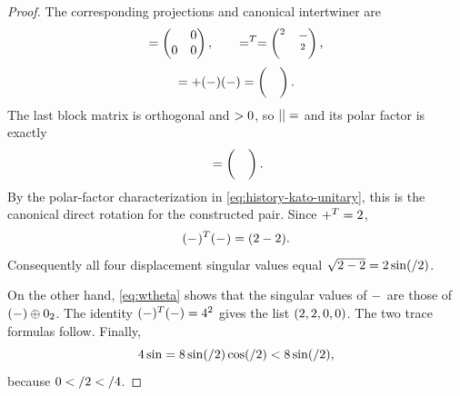 \begin{proof}
The corresponding projections and canonical intertwiner are
\[
 \sym{Psource}=\begin{pmatrix}\sym{IdentityTwo}&0\\0&0\end{pmatrix},\qquad
 \sym{Qtarget}=\sym{Yframe}\sym{Yframe}^T=\begin{pmatrix}\like{CosAngle}{\symglyph{CosAngle}^2}\sym{IdentityTwo}&-\sym{SinAngle}\sym{CosAngle}\sym{Jturn}\\\sym{SinAngle}\sym{CosAngle}\sym{Jturn}&\like{SinAngle}{\symglyph{SinAngle}^2}\sym{IdentityTwo}\end{pmatrix},
\]
\begin{equation}
 \sym{IntertwinerT}=\sym{Qtarget}\sym{Psource}+(\sym{Identity}-\sym{Qtarget})(\sym{Identity}-\sym{Psource})
   =\sym{CosAngle}\begin{pmatrix}\sym{CosAngle}\sym{IdentityTwo}&\sym{SinAngle}\sym{Jturn}\\\sym{SinAngle}\sym{Jturn}&\sym{CosAngle}\sym{IdentityTwo}\end{pmatrix}.
 \label{eq:intertwiner-theta}
\end{equation}
The last block matrix is orthogonal and $\sym{CosAngle}>0$, so $|\sym{IntertwinerT}|=\sym{CosAngle}\sym{IdentityFour}$ and
its polar factor is exactly
\[
 \like{Rrotation}{\symglyph{Rrotation}_{\symglyph{theta}}}=\begin{pmatrix}\sym{CosAngle}\sym{IdentityTwo}&\sym{SinAngle}\sym{Jturn}\\\sym{SinAngle}\sym{Jturn}&\sym{CosAngle}\sym{IdentityTwo}\end{pmatrix}.
\]
By the polar-factor characterization in \cref{eq:history-kato-unitary},
this is the canonical direct rotation for the constructed pair.
Since $\like{Rrotation}{\symglyph{Rrotation}_{\symglyph{theta}}}+\like{Rrotation}{\symglyph{Rrotation}_{\symglyph{theta}}}^T=2\sym{CosAngle}\sym{IdentityFour}$,
\[
 (\sym{Identity}-\like{Rrotation}{\symglyph{Rrotation}_{\symglyph{theta}}})^T(\sym{Identity}-\like{Rrotation}{\symglyph{Rrotation}_{\symglyph{theta}}})=(2-2\sym{CosAngle})\sym{IdentityFour}.
\]
Consequently all four displacement singular values equal
$\sqrt{2-2\sym{CosAngle}}=2\sin(\sym{theta}/2)$.

On the other hand, \cref{eq:wtheta} shows that the singular values of
$\sym{Identity}-\like{Wcompetitor}{\symglyph{Wcompetitor}_{\symglyph{theta}}}$ are those of $(\sym{IdentityTwo}-\sym{Cturn})\oplus0_2$.
The identity
$(\sym{IdentityTwo}-\sym{Cturn})^T(\sym{IdentityTwo}-\sym{Cturn})=4\like{SinAngle}{\symglyph{SinAngle}^2}\sym{IdentityTwo}$ gives the list
$(2\sym{SinAngle},2\sym{SinAngle},0,0)$. The two trace formulas follow. Finally,
\[
 4\sin\sym{theta}
 =8\sin(\sym{theta}/2)\cos(\sym{theta}/2)
 <8\sin(\sym{theta}/2),
\]
because $0<\sym{theta}/2<\sym{PiConstant}/4$.
\end{proof}

